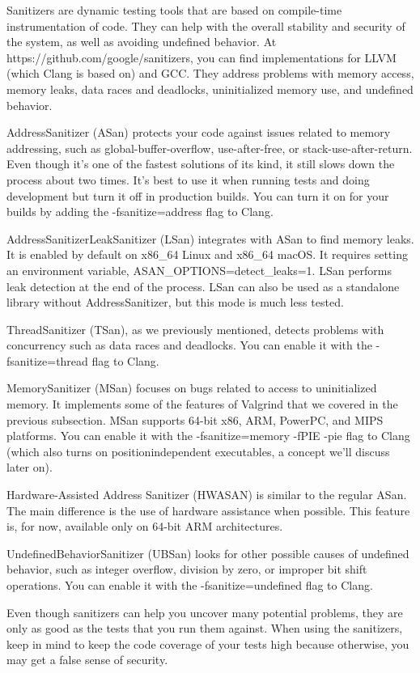 Sanitizers are dynamic testing tools that are based on compile-time instrumentation of code. They can help with the overall stability and security of the system, as well as avoiding undefined behavior. At https://github.com/google/sanitizers, you can find implementations for LLVM (which Clang is based on) and GCC. They address problems with memory access, memory leaks, data races and deadlocks, uninitialized memory use,
and undefined behavior.

AddressSanitizer (ASan) protects your code against issues related to memory addressing, such as global-buffer-overflow, use-after-free, or stack-use-after-return. Even though it's one of the fastest solutions of its kind, it still slows down the process about two times. It's best to use it when running tests and doing development but turn it off in production builds. You can turn it on for your builds by adding the -fsanitize=address flag to Clang.

AddressSanitizerLeakSanitizer (LSan) integrates with ASan to find memory leaks. It is enabled by default on x86\_64 Linux and x86\_64 macOS. It requires setting an environment variable, ASAN\_OPTIONS=detect\_leaks=1. LSan performs leak detection at the end of the process. LSan can also be used as a standalone library without AddressSanitizer, but this mode is much less tested.

ThreadSanitizer (TSan), as we previously mentioned, detects problems with concurrency such as data races and deadlocks. You can enable it with the -fsanitize=thread flag to Clang.

MemorySanitizer (MSan) focuses on bugs related to access to uninitialized memory. It implements some of the features of Valgrind that we covered in the previous subsection. MSan supports 64-bit x86, ARM, PowerPC, and MIPS platforms. You can enable it with the -fsanitize=memory -fPIE -pie flag to Clang (which also turns on positionindependent executables, a concept we'll discuss later on).

Hardware-Assisted Address Sanitizer (HWASAN) is similar to the regular ASan. The main difference is the use of hardware assistance when possible. This feature is, for now, available only on 64-bit ARM architectures.

UndefinedBehaviorSanitizer (UBSan) looks for other possible causes of undefined behavior, such as integer overflow, division by zero, or improper bit shift operations. You can enable it with the -fsanitize=undefined flag to Clang.

Even though sanitizers can help you uncover many potential problems, they are only as good as the tests that you run them against. When using the sanitizers, keep in mind to keep the code coverage of your tests high because otherwise, you may get a false sense of security.

